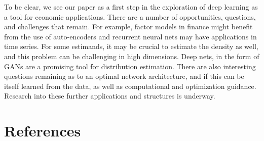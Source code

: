 \documentclass[11pt]{article}
\numberwithin{equation}{section}
\theoremstyle{definition}
\begin{document}
To be clear, we see our paper as a first step in the exploration of deep learning as a tool for economic applications. There are a number of opportunities, questions, and challenges that remain. For example, factor models in finance might benefit from the use of auto-encoders and recurrent neural nets may have applications in time series. For some estimands, it may be crucial to estimate the density as well, and this problem can be challenging in high dimensions. Deep nets, in the form of GANs are a promising tool for distribution estimation. There are also interesting questions remaining as to an optimal network architecture, and if this can be itself learned from the data, as well as computational and optimization guidance. Research into these further applications and structures is underway. 









\section{References}
\singlespacing
\begingroup
\renewcommand{\section}[2]{}	%
{}

\endgroup
\end{document}
